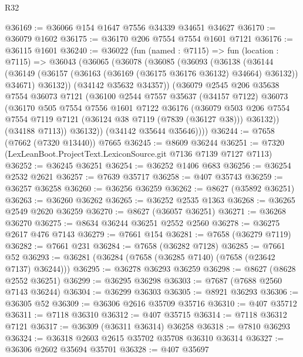 \begin{lexlean}{R32}
\begin{coremodule}
@36169 := @36066 @154 @1647 @7556 @34339 @34651 @34627
@36170 := @36079 @1602
@36175 := @36170 @206 @7554 @7554 @1601 @7121
@36176 := @36115 @1601
@36240 := @36022
    (fun (named : @7115) =>
    fun (location : @7115) =>
    @36043
      (@36065
        (@36078
          (@36085
            (@36093
              (@36138
                (@36144
                  (@36149 (@36157 (@36163 (@36169 (@36175 @36176 @36132) @34664) @36132)) @34671)
                  @36132))
              (@34142 @35632 @34357))
            (@36079
              @2545
              @206
              @35638
              @7554
              @36073
              @7121
              (@36100
                @2544
                @7557
                @35637
                (@34157 @7122)
                @36073
                (@36170
                  @505
                  @7554
                  @7556
                  @1601
                  @7122
                  @36176
                  (@36079
                    @503
                    @206
                    @7554
                    @7554
                    @7119
                    @7121
                    (@36124 @38 @7119 (@7839 (@36127 @38)))
                    @36132))
                (@34188 @7113))
              @36132))
          (@34142 @35644 @35646))))
@36244 := @7658 (@7662 (@7320 @13440)) @7665
@36245 := @8609 @36244
@36251 := @7320 (LexLeanBoot.ProjectText.LexiconSource.git @7136 @7139 @7127 @7113)
@36252 := @36245 @36251
@36254 := @36252 @1406 @683
@36256 := @36254 @2532 @2621
@36257 := @7639 @35717
@36258 := @407 @35743
@36259 := @36257 @36258
@36260 := @36256 @36259
@36262 := @8627 (@35892 @36251)
@36263 := @36260 @36262
@36265 := @36252 @2535 @1363
@36268 := @36265 @2549 @2620 @36259
@36270 := @8627 (@36057 @36251)
@36271 := @36268 @36270
@36275 := @8634 @36244 @36251 @2552 @2560
@36278 := @36275 @2617 @476 @7143
@36279 := @7661 @154
@36281 := @7658 (@36279 @7119)
@36282 := @7661 @231
@36284 := @7658 (@36282 @7128)
@36285 := @7661 @52
@36293 := @36281 (@36284 (@7658 (@36285 @7140) (@7658 (@23642 @7137) @36244)))
@36295 := @36278 @36293 @36259
@36298 := @8627 (@8628 @2552 @36251)
@36299 := @36295 @36298
@36303 := @7687 (@7688 @2560 @7143 @36244)
@36304 := @36299 @36303
@36305 := @8921 @36293
@36306 := @36305 @52
@36309 := @36306 @2616 @35709 @35716
@36310 := @407 @35712
@36311 := @7118 @36310
@36312 := @407 @35715
@36314 := @7118 @36312 @7121
@36317 := @36309 (@36311 @36314) @36258
@36318 := @7810 @36293
@36324 := @36318 @2603 @2615 @35702 @35708 @36310 @36314
@36327 := @36306 @2602 @35694 @35701
@36328 := @407 @35697

\end{coremodule}
\end{lexlean}
